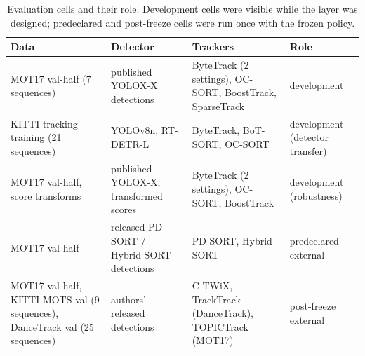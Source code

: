 \begin{table}[t]
\centering
\caption{Evaluation cells and their role. Development cells were visible while the layer was designed; predeclared and post-freeze cells were run once with the frozen policy.}
\label{tab:data}
\small
\begin{tabular}{p{3.0cm}p{3.6cm}p{4.6cm}p{3.2cm}}
\hline
Data & Detector & Trackers & Role \\
\hline
MOT17 val-half (7 sequences) & published YOLOX-X detections & ByteTrack (2 settings), OC-SORT, BoostTrack, SparseTrack & development \\
KITTI tracking training (21 sequences) & YOLOv8n, RT-DETR-L & ByteTrack, BoT-SORT, OC-SORT & development (detector transfer) \\
MOT17 val-half, score transforms & published YOLOX-X, transformed scores & ByteTrack (2 settings), OC-SORT, BoostTrack & development (robustness) \\
MOT17 val-half & released PD-SORT / Hybrid-SORT detections & PD-SORT, Hybrid-SORT & predeclared external \\
MOT17 val-half, KITTI MOTS val (9 sequences), DanceTrack val (25 sequences) & authors' released detections & C-TWiX, TrackTrack (DanceTrack), TOPICTrack (MOT17) & post-freeze external \\
\hline
\end{tabular}
\end{table}
